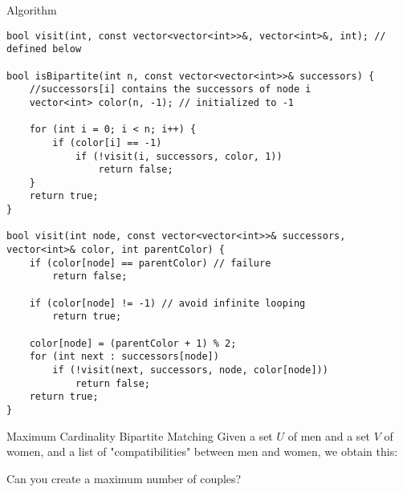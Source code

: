 \documentclass[12pt]{beamer}
\begin{document}
\begin{frame}[fragile]{Algorithm}
  \begin{lstlisting}
bool visit(int, const vector<vector<int>>&, vector<int>&, int); // defined below

bool isBipartite(int n, const vector<vector<int>>& successors) {
    //successors[i] contains the successors of node i
    vector<int> color(n, -1); // initialized to -1

    for (int i = 0; i < n; i++) {
        if (color[i] == -1)
            if (!visit(i, successors, color, 1))
                return false;
    }
    return true;
}

bool visit(int node, const vector<vector<int>>& successors, vector<int>& color, int parentColor) {
    if (color[node] == parentColor) // failure
        return false;

    if (color[node] != -1) // avoid infinite looping
        return true;

    color[node] = (parentColor + 1) % 2;
    for (int next : successors[node])
        if (!visit(next, successors, node, color[node]))
            return false;
    return true;
}
  \end{lstlisting}
\end{frame}

\begin{frame}{Maximum Cardinality Bipartite Matching}
    Given a set $U$ of men and a set $V$ of women, and a list of "compatibilities" between men and women, we obtain this:
    \centering
    
    Can you create a maximum number of couples?
\end{frame}
\end{document}
